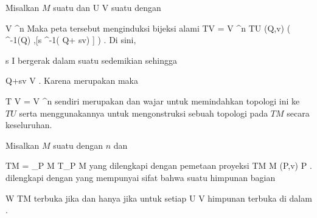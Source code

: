 {

Misalkan $M$ suatu
dan
\maabbdisp {\alpha} { U } { V
} {}
suatu
dengan

\mavergleichskette
{\vergleichskette
{ V
}
{ \subseteq }{ \R^n
}
{  }{
}
{    }{
}
{   }{
}
}
{}{}{}
Maka peta tersebut menginduksi bijeksi alami
 {TV =  V \times \R^n } { TU
} {(Q,v)} { \left(  \alpha^{-1}(Q) ,[s \mapsto \alpha^{-1}( Q+ sv) ]  \right)
} {.}
Di sini,

\mavergleichskette
{\vergleichskette
{ s
}
{ \in }{ I
}
{  }{
}
{    }{
}
{   }{
}
}
{}{}{}
bergerak dalam suatu
sedemikian sehingga

\mavergleichskette
{\vergleichskette
{ Q+sv
}
{ \in }{ V
}
{  }{
}
{    }{
}
{   }{
}
}
{}{}{}
 {} {.}
Karena
 merupakan
maka

\mavergleichskette
{\vergleichskette
{ T V
}
{ = }{ V \times \R^n
}
{  }{
}
{    }{
}
{   }{
}
}
{}{}{}
sendiri merupakan
dan wajar untuk memindahkan topologi ini ke $TU$ serta menggunakannya untuk mengonstruksi sebuah topologi pada
$TM$ secara keseluruhan.

}

{}
{

Misalkan $M$ suatu
dengan
$n$ dan

\mavergleichskettedisp
{\vergleichskette
{ TM
}
{ =} {\biguplus_{P \in M} T_P M
}
{ } {
}
{ } {
}
{ } {
}
}
{}{}{}
yang dilengkapi dengan pemetaan proyeksi
\maabbeledisp {\pi} { TM } { M
} { (P,v) } { P
} {.}
 dilengkapi dengan
yang mempunyai sifat bahwa suatu himpunan bagian

\mavergleichskette
{\vergleichskette
{ W
}
{ \subseteq }{ TM
}
{  }{
}
{    }{
}
{   }{
}
}
{}{}{}
terbuka jika dan hanya jika untuk setiap
\maabbdisp {\alpha} { U } { V
} {}
himpunan
terbuka di dalam
.

}

